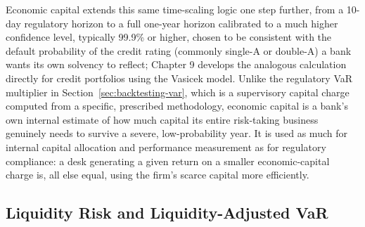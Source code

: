\documentclass[../ai_in_finance]{subfiles}
\begin{document}
Economic capital extends this same time-scaling logic one step further, from a 10-day regulatory horizon to a full one-year horizon calibrated to a much higher confidence level, typically 99.9\% or higher, chosen to be consistent with the default probability of the credit rating (commonly single-A or double-A) a bank wants its own solvency to reflect; Chapter 9 develops the analogous calculation directly for credit portfolios using the Vasicek model.
Unlike the regulatory VaR multiplier in Section~\ref{sec:backtesting-var}, which is a supervisory capital charge computed from a specific, prescribed methodology, economic capital is a bank's own internal estimate of how much capital its entire risk-taking business genuinely needs to survive a severe, low-probability year. It is used as much for internal capital allocation and performance measurement as for regulatory compliance: a desk generating a given return on a smaller economic-capital charge is, all else equal, using the firm's scarce capital more efficiently.

\subsection{Liquidity Risk and Liquidity-Adjusted VaR}
\end{document}
